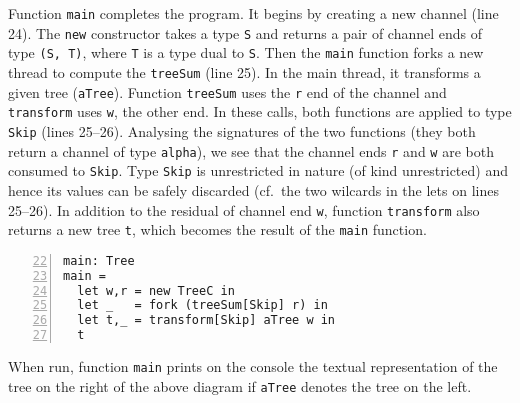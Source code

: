 Function \lstinline|main| completes the program. It begins by creating
a new channel (line 24). The \lstinline|new| constructor takes a type
\lstinline|S| and returns a pair of channel ends of type
\lstinline|(S, T)|, where \lstinline|T| is a type dual to
\lstinline|S|. Then the \lstinline|main| function forks a new thread
to compute the \lstinline|treeSum| (line 25). In the main thread, it
transforms a given tree (\lstinline|aTree|). Function
\lstinline|treeSum| uses the \lstinline|r| end of the channel and
\lstinline|transform| uses \lstinline|w|, the other end. In these
calls, both functions are applied to type \lstinline|Skip| (lines
25--26). Analysing the signatures of the two functions (they both
return a channel of type \lstinline|alpha|), we see that the channel
ends \lstinline|r| and \lstinline|w| are both consumed to
\lstinline|Skip|. Type \lstinline|Skip| is unrestricted in nature (of
kind unrestricted) and hence its values can be safely discarded (cf.\
the two wilcards in the lets on lines 25--26). In addition to the
residual of channel end \lstinline|w|, function \lstinline|transform|
also returns a new tree \lstinline|t|, which becomes the result of the
\lstinline|main| function.
%
\begin{lstlisting}[numbers=left,firstnumber=22, xleftmargin=\parindent]
main: Tree
main =
  let w,r = new TreeC in
  let _   = fork (treeSum[Skip] r) in
  let t,_ = transform[Skip] aTree w in
  t
\end{lstlisting}

When run, function \lstinline|main| prints on the console the textual
representation of the tree on the right of the above diagram if
\lstinline|aTree| denotes the tree on the left.

